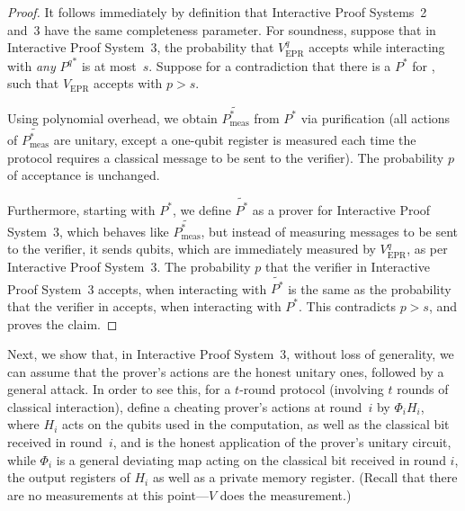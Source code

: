 \documentclass{toc}
\begin{document}
\begin{proof}
It follows immediately by definition that Interactive Proof Systems~2 and~3 have the same completeness parameter.
For soundness,
suppose that in Interactive Proof System~3, the probability that $V^{q}_{\text{EPR}}$ accepts while interacting with \emph{any} ${P^q}^*$ is at most~$s$. Suppose for a 
%
%
contradiction
that there is a $P^*$ for , such that  $V_{\text{EPR}}$ accepts with $p > s$.


Using polynomial overhead, we  obtain $\widetilde{P^*_\text{meas}}$ from $P^*$ via purification (all actions of $\widetilde{P^*_\text{meas}}$ are unitary, except a one-qubit register is measured each time the protocol requires a classical message to be sent to the verifier). The probability $p$ of acceptance is unchanged.


Furthermore, starting with $P^*$, we define $\widetilde{P^*}$ as a prover for Interactive Proof System~3, which  behaves like $\widetilde{P^*_\text{meas}}$, but instead of measuring messages to be sent to the verifier, it sends qubits, which are immediately measured by $V^{q}_{\text{EPR}}$, as per Interactive Proof System~3.
The probability $p$ that the verifier in Interactive Proof System~3 accepts, when interacting with $\widetilde{P^*}$ is the same as the probability that the verifier in  accepts, when interacting with $P^*$. This contradicts $p > s$, and proves the claim.
 \end{proof}






 Next, we show that, in Interactive Proof System~3, without loss of generality, we can assume that the prover's actions are the honest unitary ones, followed by a general
attack.
In order to see this, for a $t$-round protocol (involving $t$ rounds of classical interaction),  define a cheating prover's actions at round~$i$ %
by $\Phi_i H_i$, where $H_i$  acts on the qubits used in the computation, as well as the classical bit received in round~$i$, and is the honest application of the prover's unitary circuit, while $\Phi_i$ is a general deviating map acting on the  classical bit received in round $i$, the output registers of $H_i$ as well as a private memory register. (Recall that there are no measurements at this point---$V$ does the measurement.)
\end{document}
